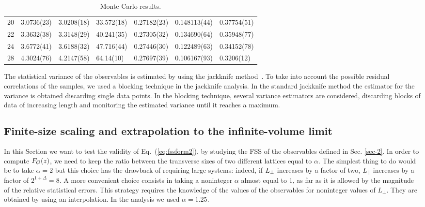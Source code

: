 \documentclass[12pt]{article}
\begin{document}
\begin{table}
\begin{center}
{\begin{tabular}{|l|l|l|l|l|l|l|}
20 & 3.0736(23) & 3.0208(18) & 33.572(18) & 0.27182(23) & 0.148113(44) & 0.37754(51)\\ 
22 & 3.3632(38) & 3.3148(29) & 40.241(35) & 0.27305(32) & 0.134690(64) & 0.35948(77)\\ 
24 & 3.6772(41) & 3.6188(32) & 47.716(44) & 0.27446(30) & 0.122489(63) & 0.34152(78)\\ 
28 & 4.3024(76) & 4.2147(58) & 64.14(10) & 0.27697(39) & 0.106167(93) & 0.3206(12)\\ 
\hline 
 \end{tabular}
}
\end{center}
\caption{Monte Carlo results.}
\label{table_tot_2}
\end{table}


The statistical variance of the observables is estimated by using the jackknife
method~\cite{Efron82}.   
To take into account the  possible residual correlations of the samples,
we used a blocking technique in the jackknife analysis. In the standard
jackknife method the estimator for the variance is obtained discarding
single data points. In the blocking technique, several variance estimators
are considered, discarding blocks of data of increasing length and monitoring 
the estimated variance until it reaches a maximum. 


\subsection{Finite-size scaling and extrapolation to the infinite-volume limit}
\label{sec5:FSS}

In this Section we want to test the validity of Eq.~(\ref{eq:fssform2}),
by studying the FSS of the observables defined in Sec. \ref{sec-2}. 
In order to compute $F_{\cal O}(z)$, we need to keep the ratio
between the transverse sizes of two different lattices equal to
$\alpha$. The simplest thing to do would be to take $\alpha=2$ but
this choice has the drawback of requiring large systems: indeed, 
if $L_{\bot}$ increases by a factor of two, $L_{\|}$ increases by a 
factor of $2^{1+\Delta} = 8$. A more
convenient choice consists in taking a noninteger 
$\alpha$ almost equal to $1$, as far
as it is allowed by the magnitude of the relative statistical errors. 
This strategy requires the knowledge of the values of the observables for
noninteger values of $L_\bot$. They are obtained by using an
interpolation.  In the analysis we used  $\alpha=1.25$.
\end{document}
